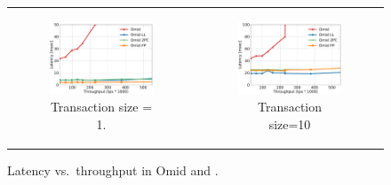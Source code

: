 \begin{figure}[htb]


\begin{tabular}{cc}

    \begin{subfigure}[t]{0.35\textwidth}
      	\includegraphics[width=\textwidth]{figs/throughputlatency1.pdf}
	    \caption[]{\small Transaction size = 1.}
        \label{fig:tl-1}      
   \end{subfigure}  
& 
    \begin{subfigure}[t]{0.35\textwidth}
	\includegraphics[width=\textwidth]{figs/throughputlatency10.pdf}
	\caption[]{\small Transaction size=10}
    \label{fig:tl-10}
  \end{subfigure}  
 \end{tabular} 
 
  \caption{\small Latency vs.\ throughput  in Omid and \sysll. }
  \vspace{-0.3cm}
  \label{fig:throughput-latency}
\end{figure}



